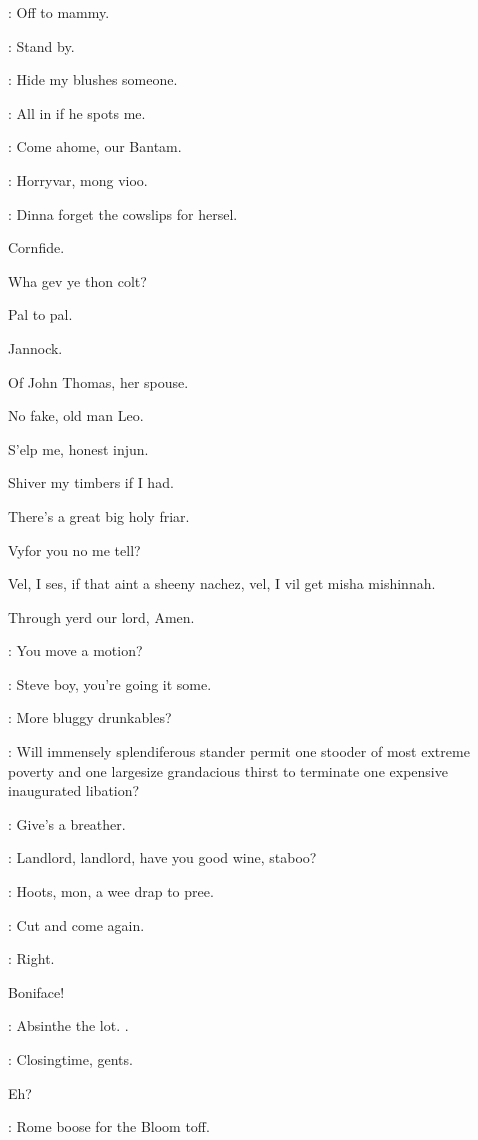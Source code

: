\madden: Off to mammy.

\dixon: Stand by.

\madden: Hide my blushes someone.


\Bloom: All in if he spots me.

\punch: Come ahome, our Bantam.

\dixon: Horryvar, mong vioo.

\crotthers: Dinna forget the cowslips for hersel.

Cornfide.

Wha gev ye thon colt?

Pal to pal.

Jannock.

Of John Thomas, her spouse.

No fake, old man Leo.

S'elp me, honest injun.

Shiver my timbers if I had.

There's a great big holy friar.

Vyfor you no me tell?

Vel, I ses, if that aint a sheeny nachez, vel, I vil get misha mishinnah.

Through yerd our lord, Amen.


\stephen: You move a motion?

\lenehan: Steve boy, you're going it some.

\dixon: More bluggy drunkables?

\lynch: Will immensely splendiferous stander permit one stooder of
most extreme poverty and one largesize grandacious thirst to terminate
one expensive inaugurated libation?

\crotthers: Give's a breather.

\punch: Landlord, landlord, have you good wine, staboo?

\crotthers: Hoots, mon, a wee drap to pree.

\lenehan: Cut and come again.

\barman: Right.

Boniface!

\stephen: Absinthe the lot.
.

\barman: Closingtime, gents.

Eh?

\stephen: Rome boose for the Bloom toff.

